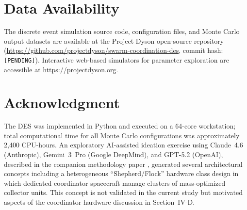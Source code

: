 \documentclass[journal]{IEEEtran}
\begin{document}
\section*{Data Availability}

The discrete event simulation source code, configuration files, and Monte Carlo output datasets are available at the Project Dyson open-source repository (\url{https://github.com/projectdyson/swarm-coordination-des}, commit hash: \texttt{[PENDING]}). Interactive web-based simulators for parameter exploration are accessible at \url{https://projectdyson.org}.

\section*{Acknowledgment}

The DES was implemented in Python and executed on a 64-core workstation; total computational time for all Monte Carlo configurations was approximately 2{,}400 CPU-hours. An exploratory AI-assisted ideation exercise using Claude~4.6 (Anthropic), Gemini~3~Pro (Google DeepMind), and GPT-5.2 (OpenAI), described in the companion methodology paper \cite{dyson_multimodel}, generated several architectural concepts including a heterogeneous ``Shepherd/Flock'' hardware class design in which dedicated coordinator spacecraft manage clusters of mass-optimized collector units. This concept is not validated in the current study but motivated aspects of the coordinator hardware discussion in Section~IV-D.
\end{document}
